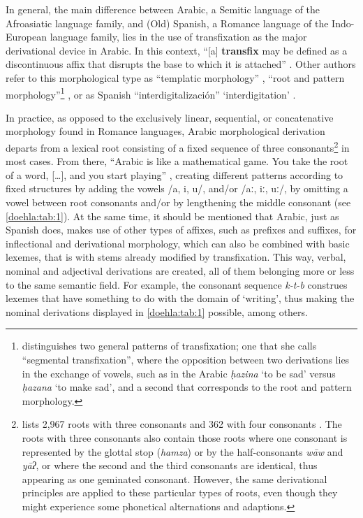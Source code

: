 \documentclass[output=paper]{langscibook}
\begin{document}
In general, the main difference between Arabic, a Semitic language of the Afroasiatic language family, and (Old) Spanish, a Romance language of the Indo-European language family, lies in the use of transfixation as the major derivational device in Arabic. In this context, “[a] \textbf{transfix} may be defined as a discontinuous affix that disrupts the base to which it is attached” \citep[552]{broselow_56_2000}. Other authors refer to this morphological type as “templatic morphology” \citep[81-82]{lieber_introducing_2009}, “root and pattern morphology”\footnote{\citet{broselow_56_2000} distinguishes two general patterns of transfixation; one that she calls “segmental transfixation”, where the opposition between two derivations lies in the exchange of vowels, such as in the Arabic \textit{ḥazina} ‘to be sad’ versus \textit{ḥazana} ‘to make sad’, and a second that corresponds to the root and pattern morphology.} \citep[99]{holes_modern_2004}, or as Spanish “interdigitalización” ‘interdigitation’ \citep[21]{bossong_creatividad_2008}. 

In practice, as opposed to the exclusively linear, sequential, or concatenative morphology found in Romance languages, Arabic morphological derivation departs from a lexical root consisting of a fixed sequence of three consonants\footnote{\citet{wehr_arabisches_1952} lists 2,967 roots with three consonants and 362 with four consonants \citep[7]{drisner_arabic_2015}. The roots with three consonants also contain those roots where one consonant is represented by the glottal stop (\textit{hamza}) or by the half-consonants \textit{wāw} and \textit{yāʔ}, or where the second and the third consonants are identical, thus appearing as one geminated consonant. However, the same derivational principles are applied to these particular types of roots, even though they might experience some phonetical alternations and adaptions.} in most cases. From there, “Arabic is like a mathematical game. You take the root of a word, […], and you start playing” \citep[4]{drisner_arabic_2015}, creating different patterns according to fixed structures by adding the vowels /a, i, u/, and/or /aː, iː, uː/, by omitting a vowel between root consonants and/or by lengthening the middle consonant (see \autoref{doehla:tab:1}). At the same time, it should be mentioned that Arabic, just as Spanish does, makes use of other types of affixes, such as prefixes and suffixes, for inflectional and derivational morphology, which can also be combined with basic lexemes, that is with stems already modified by transfixation.
This way, verbal, nominal and adjectival derivations are created, all of them belonging more or less to the same semantic field. For example, the consonant sequence \textit{k-t-b} construes lexemes that have something to do with the domain of ‘writing’, thus making the nominal derivations displayed in  \autoref{doehla:tab:1} possible, among others.
\end{document}
